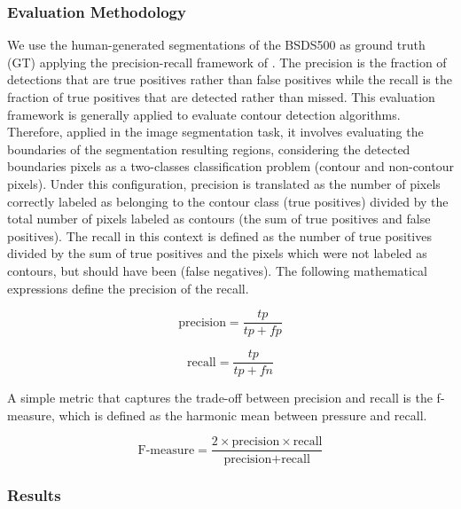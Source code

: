 \subsubsection{Evaluation Methodology}
We use the human-generated segmentations of the BSDS500 as ground truth (GT) applying the precision-recall framework of \cite{Martin.Fowlkes.ea:PAMI:2004}. The precision is the fraction of detections that are true positives rather than false positives while the recall is the fraction of true positives that are detected rather than missed. This evaluation framework is generally applied to evaluate contour detection algorithms. Therefore, applied in the image segmentation task, it involves evaluating the boundaries of the segmentation resulting regions, considering the detected boundaries pixels as a two-classes classification problem (contour and non-contour pixels). Under this configuration, precision is translated as the number of pixels correctly labeled as belonging to the contour class (true positives) divided by the total number of pixels labeled as contours (the sum of true positives and false positives). The recall in this context is defined as the number of true positives divided by the sum of true positives and the pixels which were not labeled as contours, but should have been (false negatives). The following mathematical expressions define the precision of the recall. 

\begin{equation}\label{eq:precision_score}
    \text{precision} = \frac{tp}{tp+fp}
\end{equation}

\begin{equation}\label{eq:recall_score}
    \text{recall} = \frac{tp}{tp+fn}
\end{equation}

A simple metric that captures the trade-off between precision and recall is the f-measure, which is defined as the harmonic mean between pressure and recall.

\begin{equation}\label{eq:f_score}
    \text{F-measure} = \frac{2 \times \text{precision}\times\text{recall}}{\text{precision} + \text{recall}}
\end{equation}

\subsubsection{Results}

